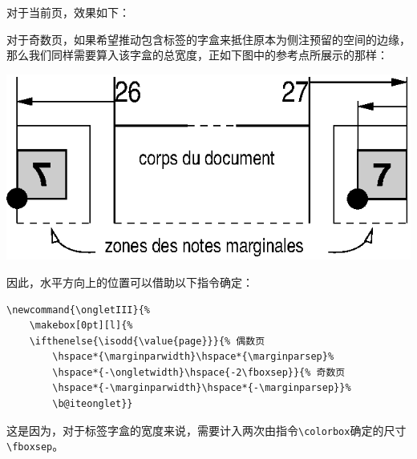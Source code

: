 对于当前页，效果如下：

\newcommand{\ongletII}{%
    \makebox[0pt][l]{%
    \ifthenelse{\isodd{\value{page}}}{%
      \hspace*{\marginparwidth}%
      \hspace*{\marginparsep}}{%
      \hspace*{-\marginparwidth}%
      \hspace*{-\marginparsep}}%
      \biteonglet}}

\ifthenelse{\isodd{\value{page}}}{%
\begin{flushright}
\bfseries\thepage\ongletII\\
\rule{\textwidth}{.4pt}
\end{flushright}}{%
\begin{flushleft}
\ongletII\bfseries\thepage\\
\rule{\textwidth}{.4pt}
\end{flushleft}}

对于奇数页，如果希望推动包含标签的字盒来抵住原本为侧注预留的空间的边缘，那么我们同样需要算入该字盒的总宽度，正如下图中的参考点所展示的那样：

\begin{center}
  \includegraphics[width=.45\textwidth]{img/onglets}
\end{center}

因此，水平方向上的位置可以借助以下指令确定：

\begin{dmd}
\begin{verbatim}
\newcommand{\ongletIII}{%
    \makebox[0pt][l]{%
    \ifthenelse{\isodd{\value{page}}}{% 偶数页
        \hspace*{\marginparwidth}\hspace*{\marginparsep}%
        \hspace*{-\ongletwidth}\hspace{-2\fboxsep}}{% 奇数页
        \hspace*{-\marginparwidth}\hspace*{-\marginparsep}}%
        \b@iteonglet}}\end{verbatim}
\end{dmd}

这是因为，对于标签字盒的宽度来说，需要计入两次由指令\verb|\colorbox|确定的尺寸\verb|\fboxsep|。

